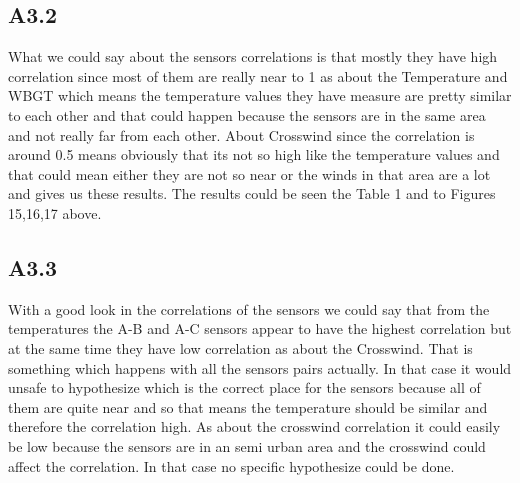 \documentclass[a4paper,12pt]{article}
\begin{document}
 \subsection{A3.2}
 What we could say about the sensors correlations is that mostly they have high correlation since most of them are really near to 1 as about the Temperature and WBGT which means the temperature values they have measure are pretty similar to each other and that could happen because the sensors are in the same area and not really far from each other. About Crosswind since the correlation is around 0.5 means obviously that its not so high like the temperature values and that could mean either they are not so near or the winds in that area are a lot and gives us these results. The results could be seen the Table 1 and to Figures 15,16,17 above.
 \subsection{A3.3}
 With a good look in the correlations of the sensors we could say that from the temperatures the A-B and A-C sensors appear to have the highest correlation but at the same time they have low correlation as about the Crosswind. That is something which happens with all the sensors pairs actually. In that case it would unsafe to hypothesize which is the correct place for the sensors because all of them are quite near and so that means the temperature should be similar and therefore the correlation high. As about the crosswind correlation it could easily be low because the sensors are in an semi urban area and the crosswind could affect the correlation. In that case no specific hypothesize could be done.
\end{document}
